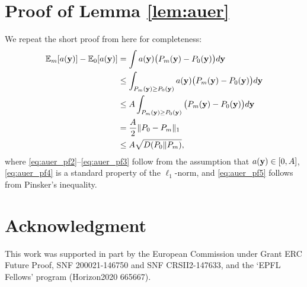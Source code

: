 \documentclass[english,onecolumn,final,11pt]{IEEEtran} %
\begin{document}
\appendix

\section{Proof of Lemma \ref{lem:auer}}

We repeat the short proof from \cite{Aue95} here for completeness:
\begin{align}
    \mathbb{E}_m[a(\mathbf{y})] - \mathbb{E}_0[a(\mathbf{y})]
        &= \int a(\mathbf{y}) \big( P_m(\mathbf{y}) - P_0(\mathbf{y}) \big) d\mathbf{y}  \\
        &\le \int_{P_m(\mathbf{y}) \ge P_0(\mathbf{y})} a(\mathbf{y}) \big( P_m(\mathbf{y}) - P_0(\mathbf{y}) \big) d\mathbf{y} \label{eq:auer_pf2} \\
        &\le A \int_{P_m(\mathbf{y}) \ge P_0(\mathbf{y})} \big( P_m(\mathbf{y}) - P_0(\mathbf{y}) \big) d\mathbf{y} \label{eq:auer_pf3}  \\
        &= \frac{A}{2} \| P_0 - P_m \|_1 \label{eq:auer_pf4}  \\
        &\le  A \sqrt{ D(P_0 \| P_m) }, \label{eq:auer_pf5} 
\end{align}
where \eqref{eq:auer_pf2}--\eqref{eq:auer_pf3} follow from the assumption that $a(\mathbf{y}) \in [0,A]$, \eqref{eq:auer_pf4} is a standard property of the $\ell_1$-norm, and \eqref{eq:auer_pf5} follows from Pinsker's inequality.

\section*{Acknowledgment}

This work was supported in part by the European Commission under Grant ERC Future Proof, SNF 200021-146750 and SNF CRSII2-147633, and the `EPFL Fellows' program (Horizon2020 665667).


% 
% 
\end{document}
